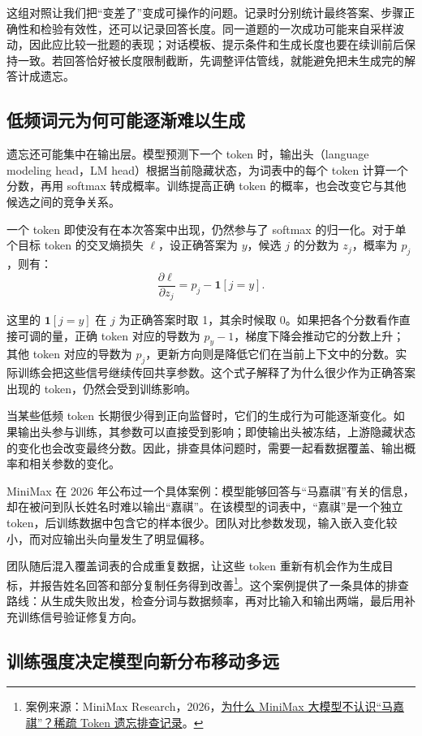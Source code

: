 这组对照让我们把“变差了”变成可操作的问题。记录时分别统计最终答案、步骤正确性和检验有效性，还可以记录回答长度。同一道题的一次成功可能来自采样波动，因此应比较一批题的表现；对话模板、提示条件和生成长度也要在续训前后保持一致。若回答恰好被长度限制截断，先调整评估管线，就能避免把未生成完的解答计成遗忘。

\subsection{低频词元为何可能逐渐难以生成}

遗忘还可能集中在输出层。模型预测下一个 token 时，输出头（language modeling head，LM head）根据当前隐藏状态，为词表中的每个 token 计算一个分数，再用 softmax 转成概率。训练提高正确 token 的概率，也会改变它与其他候选之间的竞争关系。

一个 token 即使没有在本次答案中出现，仍然参与了 softmax 的归一化。对于单个目标 token 的交叉熵损失 $\ell$，设正确答案为 $y$，候选 $j$ 的分数为 $z_j$，概率为 $p_j$，则有：
\[
\frac{\partial \ell}{\partial z_j}
=p_j-\mathbf{1}[j=y].
\]

这里的 $\mathbf{1}[j=y]$ 在 $j$ 为正确答案时取 1，其余时候取 0。如果把各个分数看作直接可调的量，正确 token 对应的导数为 $p_y-1$，梯度下降会推动它的分数上升；其他 token 对应的导数为 $p_j$，更新方向则是降低它们在当前上下文中的分数。实际训练会把这些信号继续传回共享参数。这个式子解释了为什么很少作为正确答案出现的 token，仍然会受到训练影响。

当某些低频 token 长期很少得到正向监督时，它们的生成行为可能逐渐变化。如果输出头参与训练，其参数可以直接受到影响；即使输出头被冻结，上游隐藏状态的变化也会改变最终分数。因此，排查具体问题时，需要一起看数据覆盖、输出概率和相关参数的变化。

MiniMax 在 2026 年公布过一个具体案例：模型能够回答与“马嘉祺”有关的信息，却在被问到队长姓名时难以输出“嘉祺”。在该模型的词表中，“嘉祺”是一个独立 token，后训练数据中包含它的样本很少。团队对比参数发现，输入嵌入变化较小，而对应输出头向量发生了明显偏移。

团队随后混入覆盖词表的合成重复数据，让这些 token 重新有机会作为生成目标，并报告姓名回答和部分复制任务得到改善\footnote{案例来源：MiniMax Research，2026，\href{https://www.minimax.cn/blog/sparse-token-forgetting-investigation}{为什么 MiniMax 大模型不认识“马嘉祺”？稀疏 Token 遗忘排查记录}。}。这个案例提供了一条具体的排查路线：从生成失败出发，检查分词与数据频率，再对比输入和输出两端，最后用补充训练信号验证修复方向。

\subsection{训练强度决定模型向新分布移动多远}

